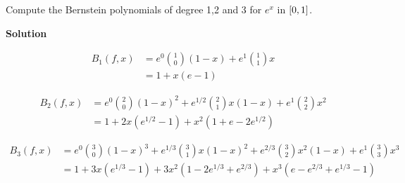 \documentclass[11pt]{amstext-l}
\newcommand{\solution}{\textbf{\large Solution}}
\begin{document}
\begin{homeworkProblem}
    Compute the Bernstein polynomials of degree 1,2 and 3 for $e^x$ in $\interval{0}{1}$.

    \solution{}

    \begin{align*}
	B_1(f,x) &= e^{0} \binom{1}{0} (1-x) + e^{1}\binom{1}{1}x \\
	&= 1 + x(e-1)
    \end{align*}

    \begin{align*}
	B_2(f,x) &= e^{0} \binom{2}{0}{(1-x)}^{2} + e^{1/2}\binom{2}{1}x(1-x) + 
	e^{1}\binom{2}{2}x^{2}\\
	& = 1 + 2x(e^{1/2} - 1) + x^{2}(1 + e - 2e^{1/2})
    \end{align*}

    \begin{align*}
	B_3(f,x) &= e^{0} \binom{3}{0}{(1-x)}^{3} + e^{1/3}\binom{3}{1}x{(1-x)}^{2} + 
	e^{2/3}\binom{3}{2}x^{2}(1-x) + e^{1}\binom{3}{3}x^{3} \\
	&= 1 + 3x(e^{1/3} - 1) + 3x^2(1 - 2e^{1/3} + e^{2/3}) + x^{3}(e - e^{2/3} + e^{1/3} - 1) 
    \end{align*}
\end{homeworkProblem}
\end{document}
